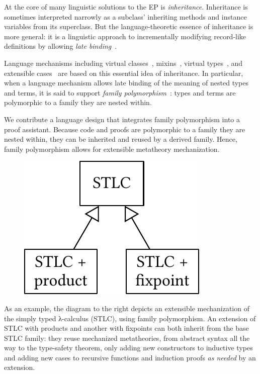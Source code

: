 At the core of many linguistic solutions to the EP is \emph{inheritance}.
Inheritance is sometimes interpreted narrowly as a subclass'
inheriting methods and instance variables from its superclass.
But the language-theoretic essence of inheritance is more general:
it is a linguistic approach to incrementally modifying
record-like definitions by allowing \emph{late binding}~\cite{cook1990inheritance}.

Language mechanisms including
virtual classes~\cite{virtualclasses-1989,vc-calculus-2006},
mixins~\cite{mixin-1990},
virtual types~\cite{thorup97}, %
and extensible cases~\cite{bac2006}
are based on this essential idea of inheritance.
%
In particular, when a language mechanism allows late binding of the
meaning of nested types and terms,
it is said to support \emph{family polymorphism}~\cite{ernst2001family}:
types and terms are polymorphic to a family they are nested within.


We contribute a language design that integrates family polymorphism into
a proof assistant.
Because code and proofs are polymorphic to a family they are nested
within, they can be
inherited and reused by a derived family.
Hence, family polymorphism allows for extensible metatheory mechanization.

\begingroup

\begin{figure}
\includegraphics[scale=.48]{graphics/stlc-intro.pdf}
\end{figure}

As an example, the diagram to the right depicts an extensible
mechanization of the simply typed λ-calculus (STLC), using family
polymorphism.
An extension of STLC with products and another with fixpoints
can both inherit from the base STLC family:
they reuse mechanized metatheories,
from abstract syntax all the way to the type-safety theorem,
only adding new constructors to inductive types
and adding new cases to recursive functions and induction proofs
\emph{as needed} by an extension.

